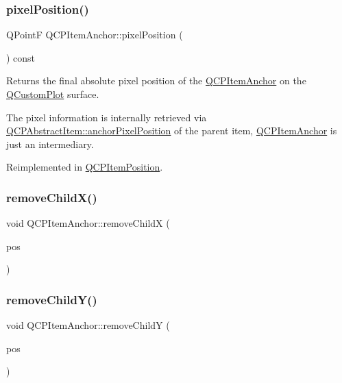 \subsubsection{\texorpdfstring{pixel\+Position()}{pixelPosition()}}
{\footnotesize\ttfamily Q\+PointF Q\+C\+P\+Item\+Anchor\+::pixel\+Position (\begin{DoxyParamCaption}{ }\end{DoxyParamCaption}) const\hspace{0.3cm}{\ttfamily [virtual]}}

Returns the final absolute pixel position of the \hyperlink{class_q_c_p_item_anchor}{Q\+C\+P\+Item\+Anchor} on the \hyperlink{class_q_custom_plot}{Q\+Custom\+Plot} surface.

The pixel information is internally retrieved via \hyperlink{class_q_c_p_abstract_item_ada5bad4e1196c4fc0d0d12328e24b8f2}{Q\+C\+P\+Abstract\+Item\+::anchor\+Pixel\+Position} of the parent item, \hyperlink{class_q_c_p_item_anchor}{Q\+C\+P\+Item\+Anchor} is just an intermediary. 

Reimplemented in \hyperlink{class_q_c_p_item_position_a8be9a4787635433edecc75164beb748d}{Q\+C\+P\+Item\+Position}.

\mbox{\label{class_q_c_p_item_anchor_a230b1d494cda63458e289bbe1b642599}} 
\subsubsection{\texorpdfstring{remove\+Child\+X()}{removeChildX()}}
{\footnotesize\ttfamily void Q\+C\+P\+Item\+Anchor\+::remove\+ChildX (\begin{DoxyParamCaption}\item[{\hyperlink{class_q_c_p_item_position}{Q\+C\+P\+Item\+Position} $\ast$}]{pos }\end{DoxyParamCaption})\hspace{0.3cm}{\ttfamily [protected]}}

\mbox{\label{class_q_c_p_item_anchor_aa2394911d8fff3bd958b9f4f1994b64d}} 
\subsubsection{\texorpdfstring{remove\+Child\+Y()}{removeChildY()}}
{\footnotesize\ttfamily void Q\+C\+P\+Item\+Anchor\+::remove\+ChildY (\begin{DoxyParamCaption}\item[{\hyperlink{class_q_c_p_item_position}{Q\+C\+P\+Item\+Position} $\ast$}]{pos }\end{DoxyParamCaption})\hspace{0.3cm}{\ttfamily [protected]}}

